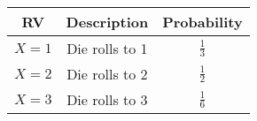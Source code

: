 
\begin{center}
\begin{tabular}{|c|c|c|}
\hline
\textbf{RV} & \textbf{Description} & \textbf{Probability}\\ \hline
$X = 1$	    &   Die rolls to 1  & $\frac{1}{3}$\\ \hline
$X = 2$	    &   Die rolls to 2  & $\frac{1}{2}$\\ \hline
$X = 3$	    &   Die rolls to 3  & $\frac{1}{6}$ \\ \hline
\end{tabular}
\end{center}
